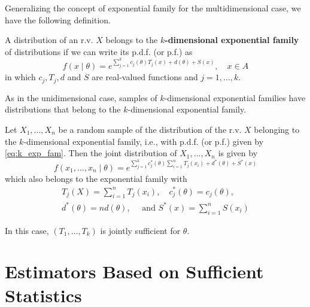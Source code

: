 \documentclass[12pt,a4paper]{report}
\begin{document}
Generalizing the concept of exponential family for the multidimensional case, we have the following definition.

\begin{definition}
    A distribution of an r.v. $X$ belongs to the \textbf{$k$-dimensional exponential family} of distributions if we can write its p.d.f. (or p.f.) as 
    \begin{equation}\label{eq:k_exp_fam}
        f(x \mid \theta) = e^{\sum_{j=1}^{k} c_j(\theta) T_j(x) + d(\theta) + S(x)}, \quad x \in A
    \end{equation}
    in which $c_j, T_j, d$ and $S$ are real-valued functions and $j = 1, \ldots, k$. 
\end{definition}

As in the unidimensional case, samples of $k$-dimensional exponential families have distributions that belong to the $k$-dimensional exponential family.

\begin{theorem}\label{thm:202301201056}
    Let $X_1, \ldots, X_n$ be a random sample of the distribution of the r.v. $X$ belonging to the $k$-dimensional exponential family, i.e., with p.d.f. (or p.f.) given by \eqref{eq:k_exp_fam}. Then the joint distribution of $X_1, \ldots, X_n$ is given by 
    \begin{equation}\label{eq:202301201056}
        f(x_1, \ldots, x_n \mid \theta) = e^{\sum_{j=1}^{k} c_j^\ast(\theta) \sum_{i=1}^n T_j(x_i) + d^\ast(\theta) + S^\ast(x)}
    \end{equation}
    which also belongs to the exponential family with 
    \begin{equation*}
        \begin{aligned}
            T_j(X) = \sum_{i=1}^{n} T_j(x_i), \quad c_j^\ast(\theta) = c_j(\theta), 
            \\ d^\ast(\theta) = n d(\theta), \quad \text{ and } S^\ast(x) = \sum_{i=1}^{n} S(x_i)
        \end{aligned}
    \end{equation*}
    
    In this case, $(T_1, \ldots, T_k)$ is jointly sufficient for $\theta$.
\end{theorem}

\section{Estimators Based on Sufficient Statistics}
\end{document}
